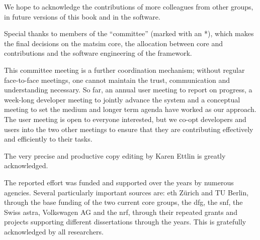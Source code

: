 % 
We hope to acknowledge the contributions of more colleagues from other groups, in future versions of this book and in the software.   

Special thanks to members of the ``committee'' (marked with an \mbox{*}), which makes the final decisions on the \gls{matsim} core, the allocation between core and \glspl{contribution} and the software engineering of the \gls{framework}.

This committee meeting is a further coordination mechanism; without regular face-to-face meetings, one cannot maintain the trust, communication and understanding necessary. So far, an annual user meeting to report on progress, a week-long developer meeting to jointly advance the system and a conceptual meeting to set the medium and longer term agenda have worked as our approach. The user meeting is open to everyone interested, but we co-opt developers and users into the two other meetings to ensure that they are contributing effectively and efficiently to their tasks. 


The very precise and productive copy editing by Karen Ettlin is greatly acknowledged. %

The reported effort was funded and supported over the years by numerous agencies. Several particularly important sources are: \gls{eth} Zürich and TU Berlin, through the base funding of the two current core groups, the \gls{dfg}, the \gls{snf}, the Swiss \gls{astra}, Volkswagen AG and the \gls{nrf}, through their repeated grants and projects supporting different dissertations through the years. This is gratefully acknowledged by all researchers. 

